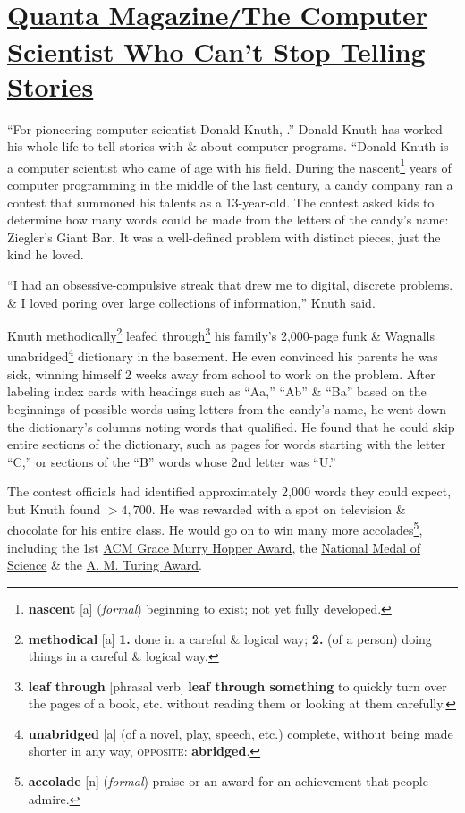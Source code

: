 \documentclass[oneside]{book}
\numberwithin{equation}{section}
\begin{document}

\section{\href{https://www.quantamagazine.org/computer-scientist-donald-knuth-cant-stop-telling-stories-20200416}{Quanta Magazine\texttt{/}The Computer Scientist Who Can't Stop Telling Stories}}
``For pioneering computer scientist Donald Knuth, .'' \textsf{Donald Knuth has worked his whole life to tell stories with \& about computer programs.} ``Donald Knuth is a computer scientist who came of age with his field. During the nascent\footnote{\textbf{nascent} [a] (\textit{formal}) beginning to exist; not yet fully developed.} years of computer programming in the middle of the last century, a candy company ran a contest that summoned his talents as a 13-year-old. The contest asked kids to determine how many words could be made from the letters of the candy's name: Ziegler's Giant Bar. It was a well-defined problem with distinct pieces, just the kind he loved.

``I had an obsessive-compulsive streak that drew me to digital, discrete problems. \& I loved poring over large collections of information,'' Knuth said.

Knuth methodically\footnote{\textbf{methodical} [a] \textbf{1.} done in a careful \& logical way; \textbf{2.} (of a person) doing things in a careful \& logical way.} leafed through\footnote{\textbf{leaf through} [phrasal verb] \textbf{leaf through something} to quickly turn over the pages of a book, etc. without reading them or looking at them carefully.} his family's 2,000-page funk \& Wagnalls unabridged\footnote{\textbf{unabridged} [a] (of a novel, play, speech, etc.) complete, without being made shorter in any way, \textsc{opposite}: \textbf{abridged}.} dictionary in the basement. He even convinced his parents he was sick, winning himself 2 weeks away from school to work on the problem. After labeling index cards with headings such as ``Aa,'' ``Ab'' \& ``Ba'' based on the beginnings of possible words using letters from the candy's name, he went down the dictionary's columns noting words that qualified. He found that he could skip entire sections of the dictionary, such as pages for words starting with the letter ``C,'' or sections of the ``B'' words whose 2nd letter was ``U.''

The contest officials had identified approximately 2,000 words they could expect, but Knuth found $> 4,700$. He was rewarded with a spot on television \& chocolate for his entire class. He would go on to win many more accolades\footnote{\textbf{accolade} [n] (\textit{formal}) praise or an award for an achievement that people admire.}, including the 1st \href{https://awards.acm.org/award_winners/knuth_1013846}{ACM Grace Murry Hopper Award}, the \href{https://www.nsf.gov/od/nms/recip_details.jsp?recip_id=198}{National Medal of Science} \& the \href{https://amturing.acm.org/award_winners/knuth_1013846.cfm}{A. M. Turing Award}.
\end{document}
